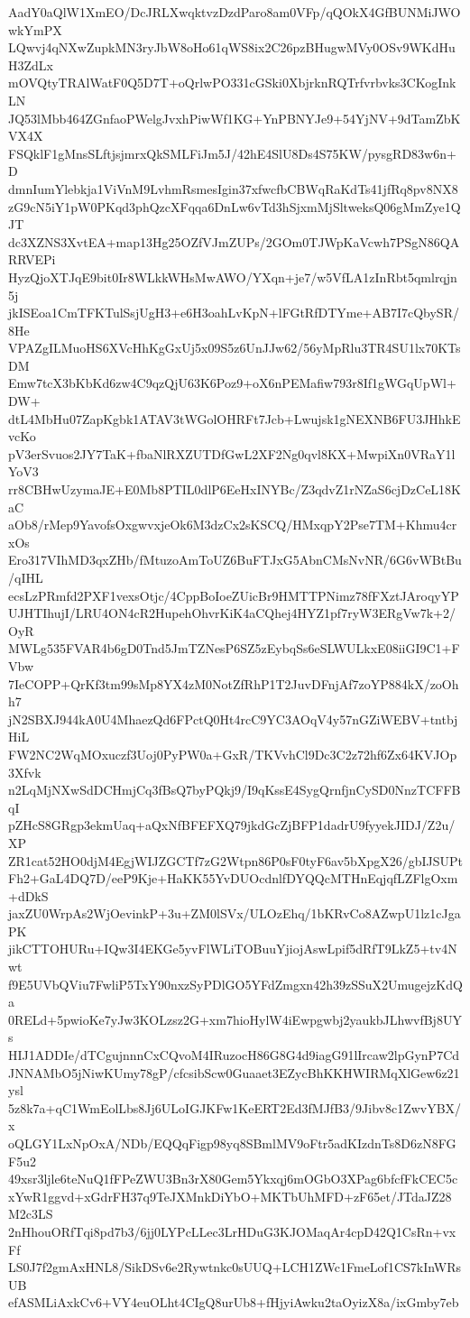 AadY0aQlW1XmEO/DcJRLXwqktvzDzdParo8am0VFp/qQOkX4GfBUNMiJWOwkYmPX
LQwvj4qNXwZupkMN3ryJbW8oHo61qWS8ix2C26pzBHugwMVy0OSv9WKdHuH3ZdLx
mOVQtyTRAlWatF0Q5D7T+oQrlwPO331cGSki0XbjrknRQTrfvrbvks3CKogInkLN
JQ53lMbb464ZGnfaoPWelgJvxhPiwWf1KG+YnPBNYJe9+54YjNV+9dTamZbKVX4X
FSQklF1gMnsSLftjsjmrxQkSMLFiJm5J/42hE4SlU8Ds4S75KW/pysgRD83w6n+D
dmnIumYlebkja1ViVnM9LvhmRsmesIgin37xfwcfbCBWqRaKdTs41jfRq8pv8NX8
zG9cN5iY1pW0PKqd3phQzcXFqqa6DnLw6vTd3hSjxmMjSltweksQ06gMmZye1QJT
dc3XZNS3XvtEA+map13Hg25OZfVJmZUPs/2GOm0TJWpKaVcwh7PSgN86QARRVEPi
HyzQjoXTJqE9bit0Ir8WLkkWHsMwAWO/YXqn+je7/w5VfLA1zInRbt5qmlrqjn5j
jkISEoa1CmTFKTulSsjUgH3+e6H3oahLvKpN+lFGtRfDTYme+AB7I7cQbySR/8He
VPAZgILMuoHS6XVcHhKgGxUj5x09S5z6UnJJw62/56yMpRlu3TR4SU1lx70KTsDM
Emw7tcX3bKbKd6zw4C9qzQjU63K6Poz9+oX6nPEMafiw793r8If1gWGqUpWl+DW+
dtL4MbHu07ZapKgbk1ATAV3tWGolOHRFt7Jcb+Lwujsk1gNEXNB6FU3JHhkEvcKo
pV3erSvuos2JY7TaK+fbaNlRXZUTDfGwL2XF2Ng0qvl8KX+MwpiXn0VRaY1lYoV3
rr8CBHwUzymaJE+E0Mb8PTIL0dlP6EeHxINYBc/Z3qdvZ1rNZaS6cjDzCeL18KaC
aOb8/rMep9YavofsOxgwvxjeOk6M3dzCx2sKSCQ/HMxqpY2Pse7TM+Khmu4crxOs
Ero317VIhMD3qxZHb/fMtuzoAmToUZ6BuFTJxG5AbnCMsNvNR/6G6vWBtBu/qIHL
ecsLzPRmfd2PXF1vexsOtjc/4CppBoIoeZUicBr9HMTTPNimz78fFXztJAroqyYP
UJHTIhujI/LRU4ON4cR2HupehOhvrKiK4aCQhej4HYZ1pf7ryW3ERgVw7k+2/OyR
MWLg535FVAR4b6gD0Tnd5JmTZNesP6SZ5zEybqSs6eSLWULkxE08iiGI9C1+FVbw
7IeCOPP+QrKf3tm99sMp8YX4zM0NotZfRhP1T2JuvDFnjAf7zoYP884kX/zoOhh7
jN2SBXJ944kA0U4MhaezQd6FPctQ0Ht4rcC9YC3AOqV4y57nGZiWEBV+tntbjHiL
FW2NC2WqMOxuczf3Uoj0PyPW0a+GxR/TKVvhCl9Dc3C2z72hf6Zx64KVJOp3Xfvk
n2LqMjNXwSdDCHmjCq3fBsQ7byPQkj9/I9qKssE4SygQrnfjnCySD0NnzTCFFBqI
pZHcS8GRgp3ekmUaq+aQxNfBFEFXQ79jkdGcZjBFP1dadrU9fyyekJIDJ/Z2u/XP
ZR1cat52HO0djM4EgjWIJZGCTf7zG2Wtpn86P0sF0tyF6av5bXpgX26/gbIJSUPt
Fh2+GaL4DQ7D/eeP9Kje+HaKK55YvDUOcdnlfDYQQcMTHnEqjqfLZFlgOxm+dDkS
jaxZU0WrpAs2WjOevinkP+3u+ZM0lSVx/ULOzEhq/1bKRvCo8AZwpU1lz1cJgaPK
jikCTTOHURu+IQw3I4EKGe5yvFlWLiTOBuuYjiojAswLpif5dRfT9LkZ5+tv4Nwt
f9E5UVbQViu7FwliP5TxY90nxzSyPDlGO5YFdZmgxn42h39zSSuX2UmugejzKdQa
0RELd+5pwioKe7yJw3KOLzsz2G+xm7hioHylW4iEwpgwbj2yaukbJLhwvfBj8UYs
HIJ1ADDIe/dTCgujnnnCxCQvoM4IRuzocH86G8G4d9iagG91lIrcaw2lpGynP7Cd
JNNAMbO5jNiwKUmy78gP/cfcsibScw0Guaaet3EZycBhKKHWIRMqXlGew6z21ysl
5z8k7a+qC1WmEolLbs8Jj6ULoIGJKFw1KeERT2Ed3fMJfB3/9Jibv8c1ZwvYBX/x
oQLGY1LxNpOxA/NDb/EQQqFigp98yq8SBmlMV9oFtr5adKIzdnTs8D6zN8FGF5u2
49xsr3ljle6teNuQ1fFPeZWU3Bn3rX80Gem5Ykxqj6mOGbO3XPag6bfcfFkCEC5c
xYwR1ggvd+xGdrFH37q9TeJXMnkDiYbO+MKTbUhMFD+zF65et/JTdaJZ28M2c3LS
2nHhouORfTqi8pd7b3/6jj0LYPcLLec3LrHDuG3KJOMaqAr4cpD42Q1CsRn+vxFf
LS0J7f2gmAxHNL8/SikDSv6e2Rywtnkc0sUUQ+LCH1ZWc1FmeLof1CS7kInWRsUB
efASMLiAxkCv6+VY4euOLht4CIgQ8urUb8+fHjyiAwku2taOyizX8a/ixGmby7eb
